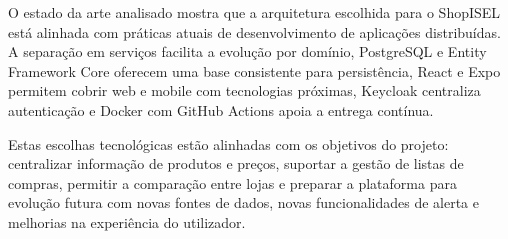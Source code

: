O estado da arte analisado mostra que a arquitetura escolhida para o ShopISEL está
alinhada com práticas atuais de desenvolvimento de aplicações distribuídas. A
separação em serviços facilita a evolução por domínio, PostgreSQL e Entity Framework
Core oferecem uma base consistente para persistência, React e Expo permitem cobrir web
e mobile com tecnologias próximas, Keycloak centraliza autenticação e Docker com
GitHub Actions apoia a entrega contínua.

Estas escolhas tecnológicas estão alinhadas com os objetivos do projeto:
centralizar informação de produtos e preços, suportar a gestão de listas de compras,
permitir a comparação entre lojas e preparar a plataforma para evolução futura com
novas fontes de dados, novas funcionalidades de alerta e melhorias na experiência do
utilizador.
